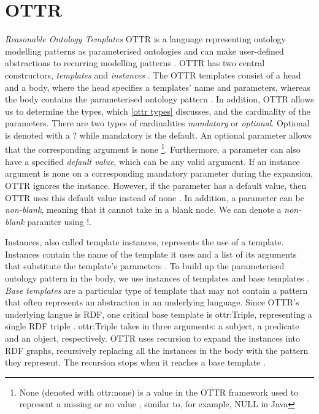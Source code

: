 \section{OTTR}
\label{OTTR}
\emph{Reasonable Ontology Templates} OTTR is a language representing ontology modelling patterns as parameterised ontologies and can make user-defined abstractions to recurring modelling patterns \autocite[477]{SLKF_OTTR_2018}. OTTR has two central constructors, \emph{templates} and \emph{instances} \autocite[3]{SLKK_OTTR_2021}. The OTTR  templates consist of a head and a body, where the head specifies a templates' name and parameters, whereas the body contains the parameterised ontology pattern \autocite[479]{SLKF_OTTR_2018}. In addition, OTTR allows us to determine the types, which \autoref{ottr types} discusses, and the cardinality of the parameters. There are two types of cardinalities \emph{mandatory} or \emph{optional}. Optional is denoted with a ? while mandatory is the default. An optional parameter allows that the corresponding argument is none \footnote{None (denoted with ottr:none) is a value in the OTTR framework used to represent a missing or no value \autocite[7]{SLKK_OTTR_2021}, similar to, for example, NULL in Java}. Furthermore, a parameter can also have a specified \emph{default value}, which can be any valid argument. If an instance argument is none on a corresponding mandatory parameter during the expansion, OTTR ignores the instance\autocite[480]{SLKF_OTTR_2018}. However, if the parameter has a default value, then OTTR uses this default value instead of none \autocite[7]{SLKK_OTTR_2021}. In addition, a parameter can be \emph{non-blank}, meaning that it cannot take in a blank node. We can denote a \emph{non-blank} paramter using !\autocite[6]{SLKK_OTTR_2021}.

\para
Instances, also called template instances, represents the use of a template.  Instances contain the name of the template it uses and a list of its arguments that substitute the template's parameters \autocite[3]{SLKK_OTTR_2021}. To build up the parameterised ontology pattern in the body, we use instances of templates and base templates \autocite[479]{SLKF_OTTR_2018}. \emph{Base templates} are a particular type of template that may not contain a pattern that often represents an abstraction in an underlying language. Since OTTR's underlying langue is RDF, one critical base template is ottr:Triple, representing a single RDF triple \autocite[4]{SLKK_OTTR_2021}. ottr:Triple takes in three arguments: a subject, a predicate and an object, respectively. OTTR uses recursion to expand the instances into RDF graphs, recursively replacing all the instances in the body with the pattern they represent. The recursion stops when it reaches a base template \autocite[479]{SLKF_OTTR_2018}.

